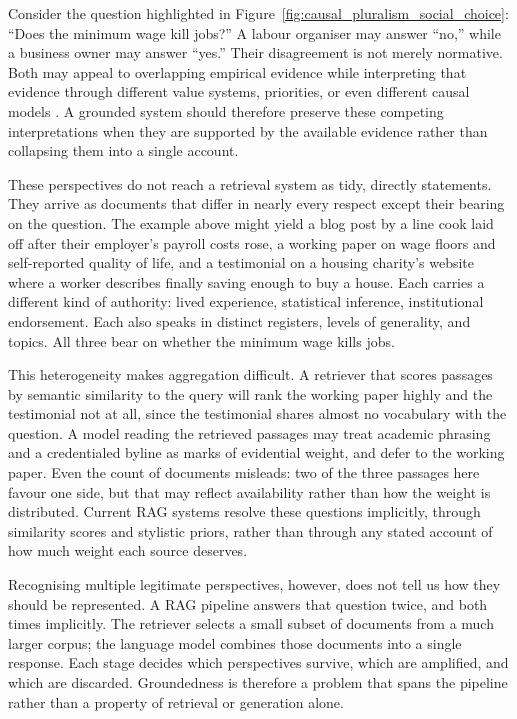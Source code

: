 Consider the question highlighted in Figure~\ref{fig:causal_pluralism_social_choice}: ``Does the minimum wage kill jobs?'' A labour organiser may answer ``no,'' while a business owner may answer ``yes.'' Their disagreement is not merely normative. Both may appeal to overlapping empirical evidence while interpreting that evidence through different value systems, priorities, or even different causal models \citep{godfrey-smith2010causal}. A grounded system should therefore preserve these competing interpretations when they are supported by the available evidence rather than collapsing them into a single account.

These perspectives do not reach a retrieval system as tidy, directly statements. They arrive as documents that differ in nearly every respect except their bearing on the question. The example above might yield a blog post by a line cook laid off after their employer's payroll costs rose, a working paper on wage floors and self-reported quality of life, and a testimonial on a housing charity's website where a worker describes finally saving enough to buy a house. Each carries a different kind of authority: lived experience, statistical inference, institutional endorsement. Each also speaks in distinct registers, levels of generality, and topics. All three bear on whether the minimum wage kills jobs.

This heterogeneity makes aggregation difficult. A retriever that scores passages by semantic similarity to the query will rank the working paper highly and the testimonial not at all, since the testimonial shares almost no vocabulary with the question. A model reading the retrieved passages may treat academic phrasing and a credentialed byline as marks of evidential weight, and defer to the working paper. Even the count of documents misleads: two of the three passages here favour one side, but that may reflect availability rather than how the weight is distributed. Current RAG systems resolve these questions implicitly, through similarity scores and stylistic priors, rather than through any stated account of how much weight each source deserves.

Recognising multiple legitimate perspectives, however, does not tell us how they should be represented. A RAG pipeline answers that question twice, and both times implicitly. The retriever selects a small subset of documents from a much larger corpus; the language model combines those documents into a single response. Each stage decides which perspectives survive, which are amplified, and which are discarded. Groundedness is therefore a problem that spans the pipeline rather than a property of retrieval or generation alone.

